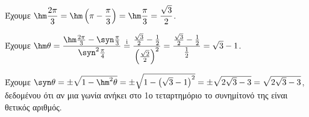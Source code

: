 \begin{alist}
\item 
\begin{rlist}
\item Έχουμε $\hm  \dfrac{2\pi}{3} = \hm  \left( \pi - \dfrac{\pi}{3} \right) = \hm  \dfrac{\pi}{3} = \dfrac{\sqrt{3}}{2}$.
\item Έχουμε $\hm  \theta = \dfrac{\hm  \frac{2\pi}{3} - \syn  \frac{\pi}{3}}{\syn ^2 \frac{\pi}{4}} \overset{\text{i}}{=} \dfrac{ \frac{\sqrt{3}}{2} - \frac{1}{2}}{ \left(\frac{\sqrt{2}}{2}\right)^2 } = \dfrac{ \frac{\sqrt{3}}{2} - \frac{1}{2} }{ \frac{1}{2} } = \sqrt{3} - 1$.
\end{rlist}
\item Έχουμε $\syn  \theta = \pm \sqrt{1 - \hm ^2 \theta} = \pm \sqrt{1 - \left( \sqrt{3} - 1 \right)^2} = \pm \sqrt{2\sqrt{3} - 3} = \sqrt{2\sqrt{3} - 3}$, δεδομένου ότι αν μια γωνία ανήκει στο 1ο τεταρτημόριο το συνημίτονό της είναι θετικός αριθμός.
\end{alist}

